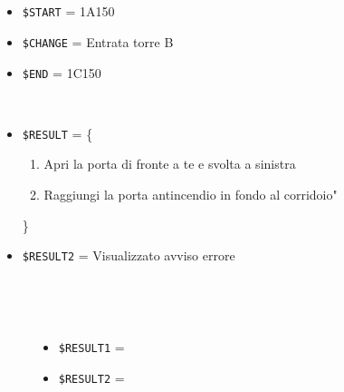 \documentclass[../../Sperimentazione.tex]{subfiles}
\begin{document}
			\paragraph*{}	
			\label{Prova3A.1}	
			\begin{tcolorbox}[fonttitle=\bfseries, 
								adjusted title={\Large Prova 3A.1}, 
								breakable, 
								sharp corners=south,
								colback=white, 
								colframe=white!60!black]
								
				\begin{description}[leftmargin=0.7cm,labelwidth=!]
				
					\item[Input] \ \par 
        				\begin{itemize}
        					\item \verb|$START| = 1A150
							\item \verb|$CHANGE| = Entrata torre B
							\item \verb|$END| = 1C150
        				\end{itemize}
        				
        			\tcbline 
        				
        			\item[Output atteso] \ \par
        				\begin{itemize}
        					\item \verb|$RESULT| = \{
        					\begin{enumerate}
        						\item Apri la porta di fronte a te e svolta a sinistra
        						\item Raggiungi la porta antincendio in fondo al corridoio"
        					\end{enumerate}
        					\}
        					\item \verb|$RESULT2| = Visualizzato avviso errore
        				\end{itemize}

					\tcbline        				
        				
        			\item[Output riscontrato] \ \par
        				\begin{description}
        				
        					\item[\dispositivoA] \ \par
        					\begin{itemize}
        						\item \verb|$RESULT1| = \ns
        						\item \verb|$RESULT2| = \ns
        					\end{itemize}      					
        					

\end{description}
\end{description}
\end{tcolorbox}
\end{document}
